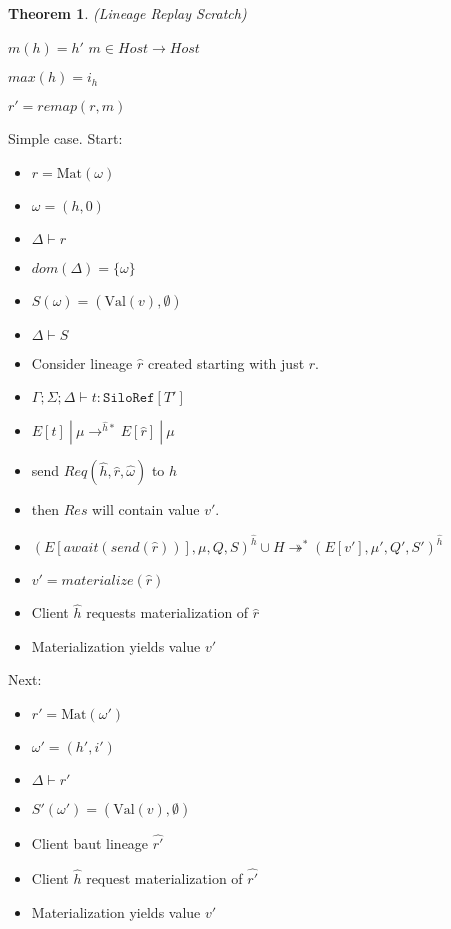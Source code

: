 \documentclass{article}
\theoremstyle{definition}
\newtheorem{thm}{Theorem}[section]
\newcommand{\Val}[1]{\text{Val}(#1)}
\begin{document}
\begin{thm}
\emph{(Lineage Replay Scratch)}\label{thm:replay2}

$m(h) = h'$
$m \in Host \rightarrow Host$

$max(h) = i_h$


$r' = remap(r, m)$

Simple case.
Start:
\begin{itemize}
\item $r = \text{Mat}(\omega)$
\item $\omega = (h, 0)$
\item $\Delta \vdash r$
\item $dom(\Delta) = \{ \omega \}$
\item $S(\omega) = ({\Val v}, \emptyset)$
\item $\Delta \vdash S$
\item Consider lineage $\hat{r}$ created starting with just $r$.
\item $\Gamma; \Sigma ; \Delta \vdash t : \texttt{SiloRef}[T']$
\item $E[t] ~|~ \mu \rightarrow^{\hat{h}*} E[\hat{r}] ~|~ \mu$
\item send $Req(\hat{h}, \hat{r}, \hat{\omega})$ to $h$
\item then $Res$ will contain value $v'$.

\item $(E[await(send(\hat{r}))], \mu, Q, S)^{\hat{h}} \cup H \twoheadrightarrow^* (E[v'], \mu', Q', S')^{\hat{h}}$

\item $v' = materialize(\hat{r})$
\item Client $\hat{h}$ requests materialization of $\hat{r}$
\item Materialization yields value $v'$
\end{itemize}

Next:
\begin{itemize}
\item $r' = \text{Mat}(\omega')$
\item $\omega' = (h', i')$
\item $\Delta \vdash r'$
\item $S'(\omega') = ({\Val v}, \emptyset)$
\item Client baut lineage $\hat{r'}$
\item Client $\hat{h}$ request materialization of $\hat{r'}$
\item Materialization yields value $v'$
\end{itemize}




\end{thm}
\end{document}
